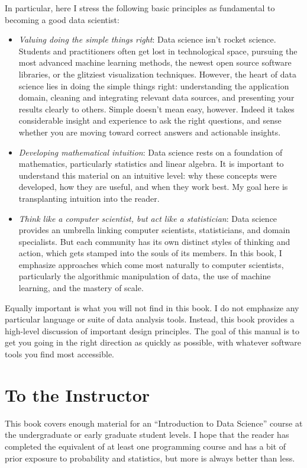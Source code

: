 \documentclass[10pt]{article}
\begin{document}
In particular, here I stress the following basic principles as fundamental to becoming a good data scientist:
\begin{itemize}
  \item \textit{Valuing doing the simple things right}: Data science isn't rocket science. Students and practitioners often get lost in technological space, pursuing the most advanced machine learning methods, the newest open source software libraries, or the glitziest visualization techniques. However, the heart of data science lies in doing the simple things right: understanding the application domain, cleaning and integrating relevant data sources, and presenting your results clearly to others. Simple doesn't mean easy, however. Indeed it takes considerable insight and experience to ask the right questions, and sense whether you are moving toward correct answers and actionable insights.
  \item \textit{Developing mathematical intuition}: Data science rests on a foundation of mathematics, particularly statistics and linear algebra. It is important to understand this material on an intuitive level: why these concepts were developed, how they are useful, and when they work best. My goal here is transplanting intuition into the reader.
  \item \textit{Think like a computer scientist, but act like a statistician}: Data science provides an umbrella linking computer scientists, statisticians, and domain specialists. But each community has its own distinct styles of thinking and action, which gets stamped into the souls of its members. In this book, I emphasize approaches which come most naturally to computer scientists, particularly the algorithmic manipulation of data, the use of machine learning, and the mastery of scale.
\end{itemize}

Equally important is what you will not find in this book. I do not emphasize any particular language or suite of data analysis tools. Instead, this book provides a high-level discussion of important design principles. The goal of this manual is to get you going in the right direction as quickly as possible, with whatever software tools you find most accessible.

\section*{To the Instructor}
This book covers enough material for an ``Introduction to Data Science'' course at the undergraduate or early graduate student levels. I hope that the reader has completed the equivalent of at least one programming course and has a bit of prior exposure to probability and statistics, but more is always better than less.
\end{document}
